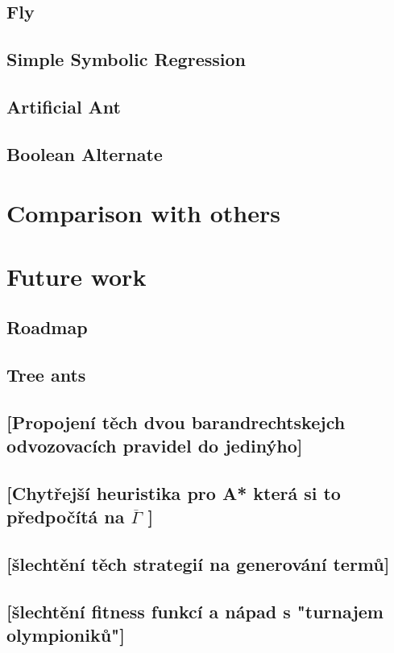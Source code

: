 \documentclass[12pt,a4paper]{report}
\begin{document}
		\section{Fly}
		\section{Simple Symbolic Regression}
		\section{Artificial Ant}
		\section{Boolean Alternate}
		
\chapter{Comparison with others}

\chapter{Future work}

\section{Roadmap}
\section{Tree ants}
\section{[Propojení těch dvou barandrechtskejch odvozovacích pravidel do jedinýho]}
\section{[Chytřejší heuristika pro A* která si to předpočítá na $\overline{\Gamma}$ ]}
\section{[šlechtění těch strategií na generování termů]}
\section{[šlechtění fitness funkcí a nápad s "turnajem olympioniků"]}
\end{document}
